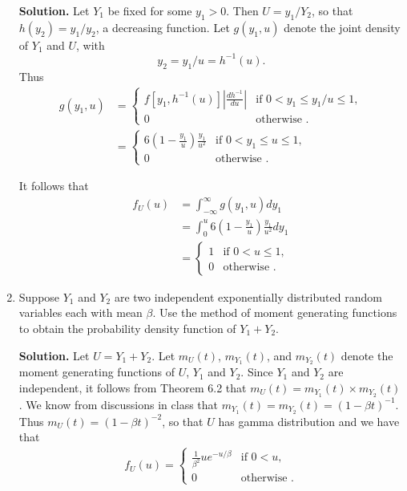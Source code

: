 \documentclass[9pt]{article}
\newcommand{\D}{\displaystyle}
\begin{document}
\begin{enumerate}
      \textbf{Solution.} Let $Y_1$ be fixed for some $y_1 > 0$. Then
      $U = y_1 / Y_2$, so that $h(y_2) = y_1 / y_2$, a decreasing function. Let
      $g(y_1, u)$ denote the joint density of $Y_1$ and $U$, with
      $$y_2 = y_1 / u = h^{-1}(u).$$
      Thus
      \begin{align*}
         g(y_1, u) &= \begin{cases}
            f[y_1, h^{-1}(u)]\left|\D\frac{dh^{-1}}{du}\right| & \text{if }
               0 < y_1 \le y_1/u \le 1, \\
               0 & \text{otherwise }.                  
            \end{cases} \\ &= \begin{cases}
            6\left(1-\D\frac{y_1}{u}\right)\D\frac{y_1}{u^2}& \text{if }
               0 < y_1 \le u \le 1, \\
               0 & \text{otherwise }.                  
            \end{cases}
      \end{align*}

      It follows that
      \begin{align*}
         f_U(u) &= \int_{-\infty}^{\infty} g(y_1, u) dy_1 \\
                &= \int_0^u 6\left(1-\D\frac{y_1}{u}\right)\D\frac{y_1}{u^2} dy_1 \\
                &= \begin{cases}
            1 & \text{if } 0 < u \le 1, \\
               0 & \text{otherwise }.                  
            \end{cases}
      \end{align*}

         
         
   \item Suppose $Y_1$ and $Y_2$ are two independent exponentially distributed
         random variables each with mean $\beta$. Use the method of moment
         generating functions to obtain the probability density function of
         $Y_1 + Y_2$.

      \textbf{Solution.} Let $U = Y_1 + Y_2$. Let $m_U(t)$, $m_{Y_1}(t)$,
      and $m_{Y_2}(t)$ denote the moment generating functions of $U$, $Y_1$ and
      $Y_2$. Since $Y_1$ and $Y_2$ are independent, it follows from Theorem 6.2
      that $m_U(t) = m_{Y_1}(t) \times m_{Y_2}(t)$. We know from discussions in
      class that $m_{Y_1}(t) = m_{Y_2}(t) = (1 - \beta t)^{-1}$. Thus
      $m_U(t) = (1 - \beta t)^{-2}$, so that $U$ has gamma distribution and we
      have that
      \begin{align*}
         f_U(u) = \begin{cases}
            \D\frac{1}{\beta^2}ue^{-u/\beta} & \text{if } 0 < u, \\
               0 & \text{otherwise }.                  
            \end{cases}
      \end{align*}
\end{enumerate}
\end{document}
